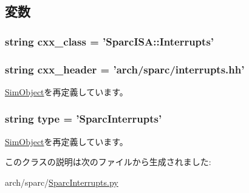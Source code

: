 \subsection{変数}
\hypertarget{classSparcInterrupts_1_1SparcInterrupts_a58cd55cd4023648e138237cfc0822ae3}{
\subsubsection[{cxx\_\-class}]{\setlength{\rightskip}{0pt plus 5cm}string {\bf cxx\_\-class} = '{\bf SparcISA::Interrupts}'}}
\label{classSparcInterrupts_1_1SparcInterrupts_a58cd55cd4023648e138237cfc0822ae3}
\hypertarget{classSparcInterrupts_1_1SparcInterrupts_a17da7064bc5c518791f0c891eff05fda}{
\subsubsection[{cxx\_\-header}]{\setlength{\rightskip}{0pt plus 5cm}string {\bf cxx\_\-header} = 'arch/sparc/interrupts.hh'}}
\label{classSparcInterrupts_1_1SparcInterrupts_a17da7064bc5c518791f0c891eff05fda}


\hyperlink{classm5_1_1SimObject_1_1SimObject_a17da7064bc5c518791f0c891eff05fda}{SimObject}を再定義しています。\hypertarget{classSparcInterrupts_1_1SparcInterrupts_acce15679d830831b0bbe8ebc2a60b2ca}{
\subsubsection[{type}]{\setlength{\rightskip}{0pt plus 5cm}string {\bf type} = '{\bf SparcInterrupts}'}}
\label{classSparcInterrupts_1_1SparcInterrupts_acce15679d830831b0bbe8ebc2a60b2ca}


\hyperlink{classm5_1_1SimObject_1_1SimObject_acce15679d830831b0bbe8ebc2a60b2ca}{SimObject}を再定義しています。

このクラスの説明は次のファイルから生成されました:\begin{DoxyCompactItemize}
\item 
arch/sparc/\hyperlink{SparcInterrupts_8py}{SparcInterrupts.py}\end{DoxyCompactItemize}
